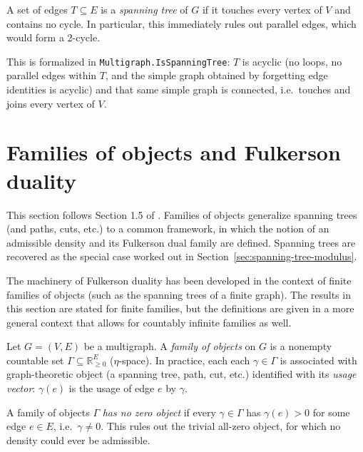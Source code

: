 \begin{definition}
\label{def:spanning-tree}
\leanok
A set of edges $T \subseteq E$ is a \emph{spanning tree} of $G$ if it touches
every vertex of $V$ and contains no cycle. In particular, this immediately rules
out parallel edges, which would form a 2-cycle.

This is formalized in \texttt{Multigraph.IsSpanningTree}: $T$ is acyclic (no
loops, no parallel edges within $T$, and the simple graph obtained by forgetting
edge identities is acyclic) and that same simple graph is connected, i.e.\
touches and joins every vertex of $V$.
\end{definition}

\section{Families of objects and Fulkerson duality}

This section follows Section 1.5 of \feupaperref{}. Families of objects generalize
spanning trees (and paths, cuts, etc.) to a common framework, in which the
notion of an admissible density and its Fulkerson dual family are defined.
Spanning trees are recovered as the special case worked out in
Section~\ref{sec:spanning-tree-modulus}.

The machinery of Fulkerson duality has been developed in the context of finite
families of objects (such as the spanning trees of a finite graph). The results
in this section are stated for finite families, but the definitions are given in
a more general context that allows for countably infinite families as well.

\begin{definition}
\label{def:family-of-objects}
\leanok
Let $G = (V, E)$ be a multigraph. A \emph{family of objects} on $G$ is a
nonempty countable set $\Gamma \subseteq \mathbb R_{\ge 0}^E$ ($\eta$-space). In
practice, each each $\gamma \in \Gamma$ is associated with graph-theoretic
object (a spanning tree, path, cut, etc.) identified with its \emph{usage
vector}: $\gamma(e)$ is the usage of edge $e$ by $\gamma$.
\end{definition}

\begin{definition}
\label{def:family-no-zero-object}
\leanok
A family of objects $\Gamma$ \emph{has no zero object} if every $\gamma \in
\Gamma$ has $\gamma(e) > 0$ for some edge $e \in E$, i.e.\ $\gamma \ne 0$. This
rules out the trivial all-zero object, for which no density could ever be
admissible.
\end{definition}

